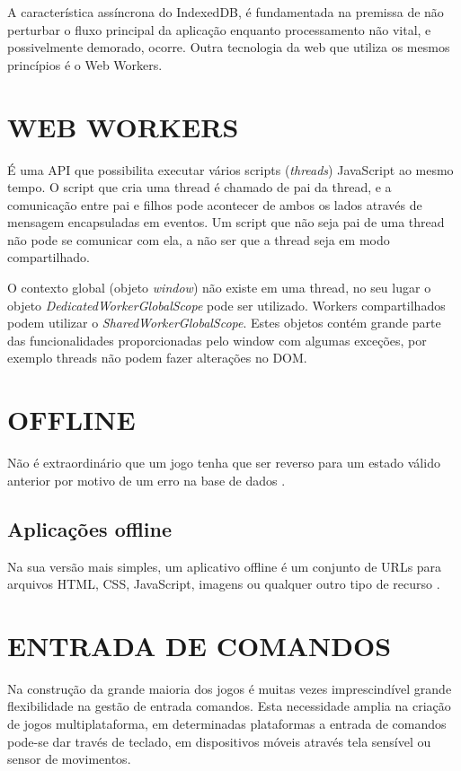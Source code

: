 
A característica assíncrona do IndexedDB, é fundamentada na
premissa de não perturbar o fluxo principal da aplicação enquanto
processamento não vital, e possivelmente demorado, ocorre. Outra
tecnologia da web que utiliza os mesmos princípios é o Web Workers.

\section{WEB WORKERS}

É uma API que possibilita executar vários scripts
(\textit{threads}) JavaScript ao mesmo tempo. O script que cria uma
thread é chamado de pai da thread, e a comunicação entre pai e filhos
pode acontecer de ambos os lados através de mensagem encapsuladas
em eventos. Um script que não seja pai de uma thread não pode se
comunicar com ela, a não ser que a thread seja em modo compartilhado.

O contexto global (objeto \textit{window}) não existe em uma
thread, no seu lugar o objeto \textit{DedicatedWorkerGlobalScope}
pode ser utilizado. Workers compartilhados podem utilizar o
\textit{SharedWorkerGlobalScope}. Estes objetos contém grande parte das
funcionalidades proporcionadas pelo window com algumas exceções, por
exemplo threads não podem fazer alterações no DOM.

\section{OFFLINE}
\begin{draft}
Não é extraordinário que um jogo tenha que ser reverso para um estado
válido anterior por motivo de um erro na base de dados \autocite[pp.
5]{browserGamesTechnologyAndFuture}.

\subsection{Aplicações offline}
Na sua versão mais simples, um aplicativo offline é um conjunto de
URLs para arquivos HTML, CSS, JavaScript, imagens ou qualquer outro tipo
de recurso \autocite{diveIntohtml}.

\end{draft}
\section{ENTRADA DE COMANDOS}

Na construção da grande maioria dos jogos é muitas vezes
imprescindível grande flexibilidade na gestão de entrada comandos.
Esta necessidade amplia na criação de jogos multiplataforma, em
determinadas plataformas a entrada de comandos pode-se dar través de
teclado, em dispositivos móveis através tela sensível ou sensor de
movimentos.

